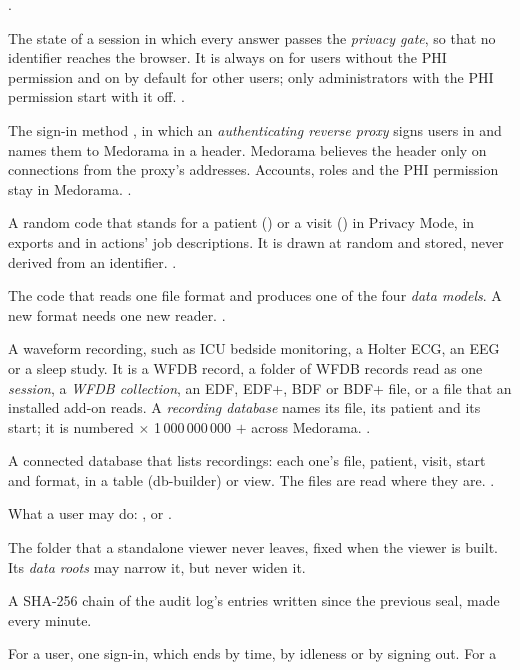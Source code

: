 \begin{description}
  .
\item[Privacy Mode] The state of a session in which every answer passes the \textit{privacy gate},
  so that no identifier reaches the browser. It is always on for users without the PHI
  permission and on by default for other users; only administrators with the PHI permission start
  with it off. .
\item[Proxy sign-in] The sign-in method , in which an \textit{authenticating reverse
  proxy} signs users in and names them to Medorama in a header. Medorama believes the header only
  on connections from the proxy's addresses. Accounts, roles and the PHI permission stay in
  Medorama. .
\item[Pseudonym] A random code that stands for a patient () or a visit
  () in Privacy Mode, in exports and in actions' job descriptions. It is
  drawn at random and stored, never derived from an identifier. .
\item[Reader] The code that reads one file format and produces one of the four \textit{data
  models}. A new format needs one new reader. .
\item[Recording] A waveform recording, such as ICU bedside monitoring, a Holter ECG, an EEG or a
  sleep study. It is a WFDB record, a folder of WFDB records read as one \textit{session}, a
  \textit{WFDB collection}, an EDF, EDF+, BDF or BDF+ file, or a file that an installed add-on
  reads. A \textit{recording database} names its file, its patient and its start; it is
  numbered  $\times$ 1\,000\,000\,000 $+$  across Medorama.
  .
\item[Recording database] A connected database that lists recordings: each one's file, patient,
  visit, start and format, in a  table (db-builder) or view. The files are read
  where they are. .
\item[Role] What a user may do: ,  or .
\item[Root] The folder that a standalone viewer never leaves, fixed when the viewer is built. Its
  \textit{data roots} may narrow it, but never widen it.
\item[Seal] A SHA-256 chain of the audit log's entries written since the previous seal, made
  every minute.
\item[Session] For a user, one sign-in, which ends by time, by idleness or by signing out. For a

\end{description}
